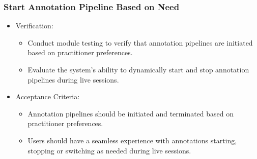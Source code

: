 \documentclass[12pt]{article}
\begin{document}
\subsubsection{Start Annotation Pipeline Based on Need}
\begin{itemize}
    \item Verification:
        \begin{itemize}
            \item Conduct module testing to verify that annotation pipelines are initiated based on practitioner preferences.
            \item Evaluate the system’s ability to dynamically start and stop annotation pipelines during live sessions.
        \end{itemize}
    \item Acceptance Criteria:
        \begin{itemize}
            \item Annotation pipelines should be initiated and terminated based on practitioner preferences.
            \item Users should have a seamless experience with annotations starting, stopping or switching as needed during live sessions.
        \end{itemize}
\end{itemize}
\end{document}
